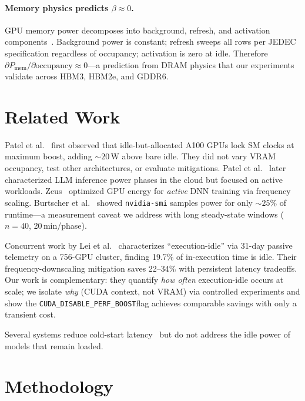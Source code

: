 \documentclass[sigconf,anonymous,review]{acmart}
\newcommand{\perfboost}{\texttt{CUDA\_\hspace{0pt}DISABLE\_\hspace{0pt}PERF\_\hspace{0pt}BOOST}}
\begin{document}
\paragraph{Memory physics predicts $\beta \approx 0$.} GPU memory power decomposes into background, refresh, and activation components~\cite{hbm-spec,micron-ddr}. Background power is constant; refresh sweeps all rows per JEDEC specification regardless of occupancy; activation is zero at idle. Therefore $\partial P_{\text{mem}} / \partial \text{occupancy} \approx 0$---a prediction from DRAM physics that our experiments validate across HBM3, HBM2e, and GDDR6.

\section{Related Work}

Patel et al.~\cite{patel-cal23} first observed that idle-but-allocated A100 GPUs lock SM clocks at maximum boost, adding ${\sim}20$\,W above bare idle. They did not vary VRAM occupancy, test other architectures, or evaluate mitigations. Patel et al.~\cite{patel-asplos24} later characterized LLM inference power phases in the cloud but focused on active workloads. Zeus~\cite{zeus} optimized GPU energy for \emph{active} DNN training via frequency scaling. Burtscher et al.~\cite{burtscher-power} showed \texttt{nvidia-smi} samples power for only ${\sim}25$\% of runtime---a measurement caveat we address with long steady-state windows ($n=40$, 20\,min/phase).

Concurrent work by Lei et al.~\cite{lei-idle} characterizes ``execution-idle'' via 31-day passive telemetry on a 756-GPU cluster, finding 19.7\% of in-execution time is idle. Their frequency-downscaling mitigation saves 22--34\% with persistent latency tradeoffs. Our work is complementary: they quantify \emph{how often} execution-idle occurs at scale; we isolate \emph{why} (CUDA context, not VRAM) via controlled experiments and show the \perfboost flag achieves comparable savings with only a transient cost.

Several systems reduce cold-start latency~\cite{serverlessllm,nvidia-streamer,hydraserve,lambdascale} but do not address the idle power of models that remain loaded.

\section{Methodology}
\end{document}
